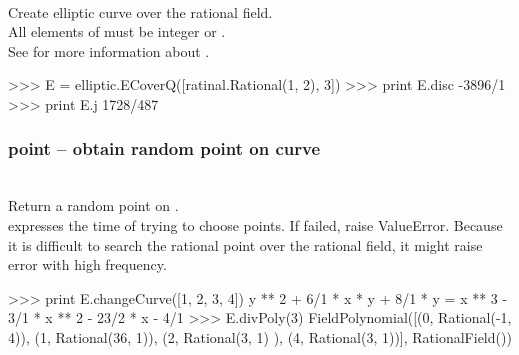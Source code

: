 \initialize
  \\
  \spacing
  \quad Create elliptic curve over the rational field.\\
  \spacing
  \quad All elements of  must be integer or . \\
  See  for more information about .\\
\begin{ex}
>>> E = elliptic.ECoverQ([ratinal.Rational(1, 2), 3])
>>> print E.disc
-3896/1
>>> print E.j
1728/487
\end{ex}%
  \method
  \subsubsection{point -- obtain random point on curve}
   \\
   \spacing
   \quad Return a random point on .\\
   \spacing
   \quad  {} expresses the time of trying to choose points.
   If failed, raise ValueError.
   \negok Because it is difficult to search the rational point over the rational field, it might raise error with high frequency.\\
%
\begin{ex}
>>> print E.changeCurve([1, 2, 3, 4])
y ** 2 + 6/1 * x * y + 8/1 * y = x ** 3 - 3/1 * x ** 2 - 23/2 * x - 4/1
>>> E.divPoly(3)
FieldPolynomial([(0, Rational(-1, 4)), (1, Rational(36, 1)), (2, Rational(3, 1)
), (4, Rational(3, 1))], RationalField())
\end{ex}%
\C
